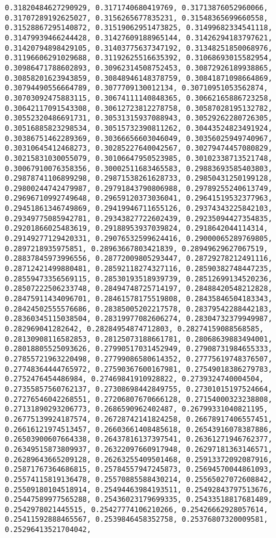 \documentclass[11pt]{article}
\begin{document}
\begin{Verbatim}[commandchars=\\\{\}]
0.31820484627290929, 0.3171740680419769, 0.31713876052960066, 0.31707289192625027, 0.3156265677835231, 0.31548365699660558, 0.31528867295140872, 0.31519062951473825, 0.31499682334541118, 0.31479939466244428, 0.31427609188965144, 0.31426294183797621, 0.31420794898429105, 0.31403775637347192, 0.31348251850068976, 0.31196606291029688, 0.31192625516635392, 0.31068693015582954, 0.30986471788602893, 0.30962314508752453, 0.30872926189938865, 0.30858201623943859, 0.30848946148378759, 0.30841871098664869, 0.30794490556664789, 0.3077709130012134, 0.30710951053562874, 0.30703092475883115, 0.30674111140848365, 0.30662165886723258, 0.30642117091543308, 0.30612723812278758, 0.30587028195132782, 0.30552320486691731, 0.30531315937088943, 0.30529262280726305, 0.30516885823298534, 0.30515732390811262, 0.30443524823491924, 0.30386751462289369, 0.30366656603046049, 0.30356025949740967, 0.30310645412468273, 0.30285227640042567, 0.30279474457080829, 0.30215831030055079, 0.30106647950523985, 0.30102338713521748, 0.30067910076358356, 0.30002511683465583, 0.29883693585403803, 0.29878741106899298, 0.29871538261628733, 0.29850431250199128, 0.29800244742479987, 0.29791843790806988, 0.29789255240613749, 0.29696710992749648, 0.29659120373036041, 0.29641519532377963, 0.29451861346749869, 0.29419946711655126, 0.29374343225842103, 0.29349775085942781, 0.29343827722602439, 0.29235094427354835, 0.29201866025483619, 0.29188953937039824, 0.2918642044114314, 0.29149277129420331, 0.29076532599624416, 0.29000065289769805, 0.2897218935975851, 0.28963667803421839, 0.28949629627067519, 0.28837845973996556, 0.28772009805293447, 0.28729278212491116, 0.28712421499880481, 0.28592118274327116, 0.28590382748447235, 0.28559473356569115, 0.28530193518939739, 0.28512699134520236, 0.28507222506233748, 0.28494748725714197, 0.28488420548212828, 0.28475911434096701, 0.28461578175519808, 0.28435846504183343, 0.28424502555576686, 0.28385005202217578, 0.28379542288442183, 0.28360345115038504, 0.28319977082606274, 0.28304732379949987, 0.282969041282642, 0.28284954874712803, 0.28274159088568585, 0.28130908116582853, 0.28125073188661781, 0.28068639883494001, 0.28018805525093626, 0.27990517031452949, 0.27908731984655333, 0.27855721963220498, 0.27799086580614352, 0.27775619748376507, 0.27748364444765972, 0.27590367600167981, 0.27549018386279783, 0.2752476454486984, 0.27469841910928822, 0.2739324740004504, 0.27355857560762137, 0.27308698442849755, 0.27301015197524664, 0.27276546042268551, 0.27206807670666128, 0.27154000323238808, 0.27131890293206773, 0.2686590962402487, 0.26799331040821195, 0.26775139924187574, 0.26728742141824258, 0.26678917406557451, 0.26616121974513457, 0.26603661408485618, 0.26543916078387886, 0.26503900607664338, 0.26437816137397541, 0.26361271946762377, 0.26349515873809937, 0.26322097660917948, 0.26297181363146571, 0.26289643665209128, 0.26263255409501468, 0.25913372092087916, 0.25871767364686815, 0.25784557947245873, 0.25694570044861093, 0.25574115819136478, 0.25570885588430214, 0.25565027072608842, 0.25509180104518914, 0.25494463984193511, 0.25492843797513676, 0.25447589977565288, 0.25436023179699335, 0.25433518817681489, 0.2542978021445515, 0.25427774106210266, 0.25426662928057614, 0.25411592888465567, 0.2539846458352758, 0.25376807320009581, 0.25296413521704042, 
\end{Verbatim}
\end{document}
